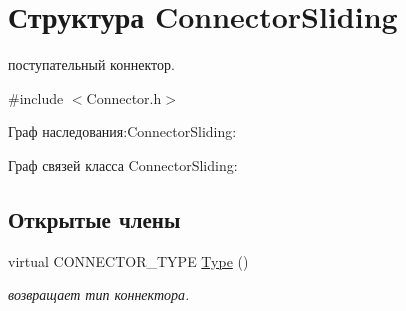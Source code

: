 \hypertarget{struct_connector_sliding}{
\section{Структура ConnectorSliding}
\label{struct_connector_sliding}
}


поступательный коннектор.  




{\ttfamily \#include $<$Connector.h$>$}



Граф наследования:ConnectorSliding:


Граф связей класса ConnectorSliding:
\subsection*{Открытые члены}
\begin{DoxyCompactItemize}
\item 
\hypertarget{struct_connector_sliding_a7173f59dba844524488032c3ebca3319}{
virtual CONNECTOR\_\-TYPE \hyperlink{struct_connector_sliding_a7173f59dba844524488032c3ebca3319}{Type} ()}
\label{struct_connector_sliding_a7173f59dba844524488032c3ebca3319}

\begin{DoxyCompactList}\small\item\em возвращает тип коннектора. \item\end{DoxyCompactList}\end{DoxyCompactItemize}
